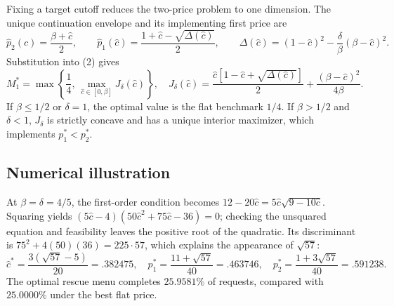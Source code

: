 \documentclass[11pt]{article}
\newcommand{\ch}{\widehat c}
\begin{document}
Fixing a target cutoff reduces the two-price problem to one dimension.  The
unique continuation envelope and its implementing first price are
\begin{equation}
\widehat p_2(\ch)=\frac{\beta+\ch}{2},\qquad
\widehat p_1(\ch)=
\frac{1+\ch-\sqrt{\Delta(\ch)}}2,\qquad
\Delta(\ch)=(1-\ch)^2-\frac{\delta}{\beta}(\beta-\ch)^2.
\tag{3}
\end{equation}
Substitution into (2) gives
\begin{equation}
M_1^*=\max\left\{\frac14,\ \max_{\ch\in[0,\beta]}J_\delta(\ch)\right\},
\quad
J_\delta(\ch)=
\frac{\ch[1-\ch+\sqrt{\Delta(\ch)}]}2
+\frac{(\beta-\ch)^2}{4\beta}.
\tag{4}
\end{equation}
If $\beta\le1/2$ or $\delta=1$, the optimal value is the flat benchmark
$1/4$.  If $\beta>1/2$ and $\delta<1$, $J_\delta$ is strictly concave and has
a unique interior maximizer, which implements $p_1^*<p_2^*$.

\subsection{Numerical illustration}

At $\beta=\delta=4/5$, the first-order condition becomes
$12-20\ch=5\ch\sqrt{9-10\ch}$.  Squaring yields
$(5\ch-4)(50\ch^2+75\ch-36)=0$; checking the unsquared equation and
feasibility leaves the positive root of the quadratic.  Its discriminant is
$75^2+4(50)(36)=225\cdot57$, which explains the appearance of $\sqrt{57}$:
\[
\ch^*=\frac{3(\sqrt{57}-5)}{20}=.382475,\quad
p_1^*=\frac{11+\sqrt{57}}{40}=.463746,\quad
p_2^*=\frac{1+3\sqrt{57}}{40}=.591238.
\]
The optimal rescue menu completes $25.9581\%$ of requests, compared with
$25.0000\%$ under the best flat price.
\end{document}
